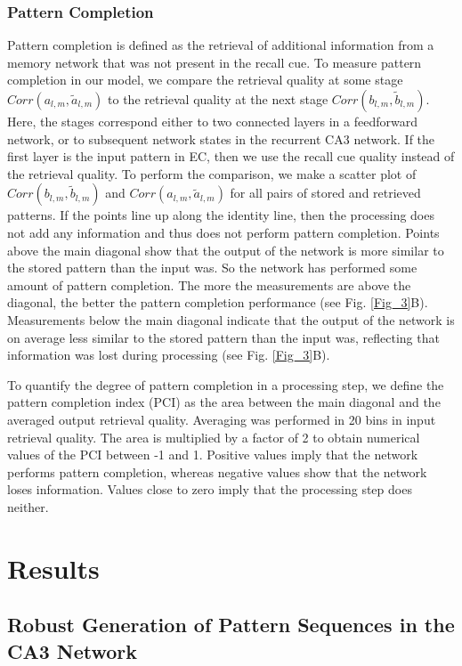 \documentclass[utf8]{frontiersSCNS} %
\begin{document}
\subsubsection{Pattern Completion}
Pattern completion is defined as the retrieval of additional information from a memory network that was not present in the recall cue. To measure pattern completion in our model, we compare the retrieval quality at some stage $Corr(a_{l, m},\tilde{a}_{l, m})$ to the retrieval quality at the next stage $Corr(b_{l, m},\tilde{b}_{l, m})$. Here, the stages correspond either to two connected layers in a feedforward network, or to subsequent network states in the recurrent CA3 network. If the first layer is the input pattern in EC, then we use the recall cue quality instead of the retrieval quality.
%
To perform the comparison, we make a scatter plot of
$Corr(b_{l, m},\tilde{b}_{l, m})$ and
$Corr(a_{l, m},\tilde{a}_{l, m})$ 
for all pairs of stored and retrieved patterns.
If the points line up along the identity line, then the processing does not add any information and thus does not perform pattern completion. Points above the main diagonal show that the output of the network is more similar to the stored pattern than the input was. So the network has performed some amount of pattern completion. The more the measurements are above the diagonal, the better the pattern completion performance (see Fig. \ref{Fig_3}B). Measurements below the main diagonal indicate that the output of the network is on average less similar to the stored pattern than the input was, reflecting that information was lost during processing (see Fig. \ref{Fig_3}B).

To quantify the degree of pattern completion in a processing step, we define the pattern completion index (PCI) as the area between the main diagonal and the averaged output retrieval quality. Averaging was performed in 20 bins in input retrieval quality. The area is multiplied by a factor of 2 to obtain numerical values of the PCI between -1 and 1. Positive values imply that the network performs pattern completion, whereas negative values show that the network loses information. Values close to zero imply that the processing step does neither. 

\section{Results}
\subsection{Robust Generation of Pattern Sequences in the CA3 Network}
\end{document}
